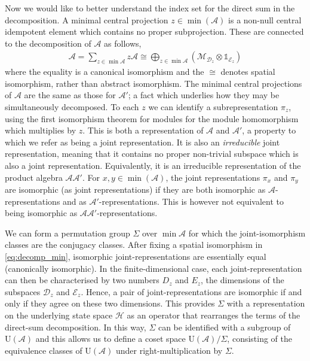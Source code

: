 \documentclass[11pt, twocolumn, floatfix, superscriptaddress, aps, prb, raggedbottom]{revtex4-2}
\begin{document}
Now we would like to better understand the index set for the direct sum in the decomposition.
A minimal central projection $z \in \min(\mathcal{A})$ is a non-null central idempotent element which contains no proper subprojection.
These are connected to the decomposition of $\mathcal{A}$ as follows,
\begin{align}
    \mathcal{A} = \sum_{z \in \min \mathcal{A}} z \mathcal{A} \cong \bigoplus_{z \in \min \mathcal{A}} (\mathcal{M}_{\mathcal{D}_z} \otimes \mathds{1}_{\mathcal{E}_z})
    \label{eq:decomp_min}
\end{align}
where the equality is a canonical isomorphism and the $\cong$ denotes spatial isomorphism, rather than abstract isomorphism.
The minimal central projections of $\mathcal{A}$ are the same as those for $\mathcal{A}'$; a fact which underlies how they may be simultaneously decomposed.
To each $z$ we can identify a subrepresentation $\pi_z$, using the first isomorphism theorem for modules for the module homomorphism which multiplies by $z$.
This is both a representation of $\mathcal{A}$ and $\mathcal{A'}$, a property to which we refer as being a joint representation.
It is also an \emph{irreducible} joint representation, meaning that it contains no proper non-trivial subspace which is also a joint representation.
Equivalently, it is an irreducible representation of the product algebra $\mathcal{A}\mathcal{A'}$.
For $x,y \in \min(\mathcal{A})$, the joint representations $\pi_x$ and $\pi_y$ are isomorphic (as joint representations) if they are both isomorphic as $\mathcal{A}$-representations and as $\mathcal{A}'$-representations.
This is however not equivalent to being isomorphic as $\mathcal{A}\mathcal{A}'$-representations.

We can form a permutation group $\Sigma$ over $\min \mathcal{A}$ for which the joint-isomorphism classes are the conjugacy classes.
After fixing a spatial isomorphism in \cref{eq:decomp_min}, isomorphic joint-representations are essentially equal (canonically isomorphic).
In the finite-dimensional case, each joint-representation can then be characterised by two numbers $D_z$ and $E_z$, the dimensions of the subspaces $\mathcal{D}_z$ and $\mathcal{E}_z$.
Hence, a pair of joint-representations are isomorphic if and only if they agree on these two dimensions.
This provides $\Sigma$ with a representation on the underlying state space $\mathcal{H}$ as an operator that rearranges the terms of the direct-sum decomposition.
In this way, $\Sigma$ can be identified with a subgroup of $\mathrm{U}(\mathcal{A})$ and this allows us to define a coset space $\mathrm{U}(\mathcal{A}) / \Sigma$, consisting of the equivalence classes of $\mathrm{U}(\mathcal{A})$ under right-multiplication by $\Sigma$.
\end{document}
